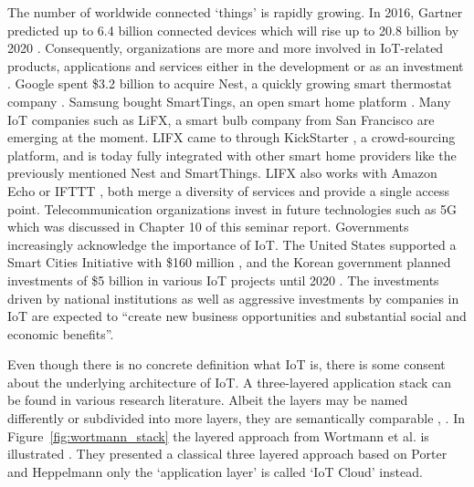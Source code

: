 	The number of worldwide connected `things' is rapidly growing. In 2016, Gartner predicted up to 6.4 billion connected devices which will rise up to 20.8 billion by 2020 \cite{gartner}. Consequently, organizations are more and more involved in IoT-related products, applications and services either in the development or as an investment \cite{ju}. Google spent \$3.2 billion to acquire Nest, a quickly growing smart thermostat company \cite{tilley_nest}. Samsung bought SmartTings, an open smart home platform \cite{tilley_smart}. Many IoT companies such as LiFX, a smart bulb company from San Francisco are emerging at the moment. LIFX came to through KickStarter , a crowd-sourcing platform, and is today fully integrated with other smart home providers like the previously mentioned Nest and SmartThings. LIFX also works with Amazon Echo  or IFTTT , both merge a diversity of services and provide a single access point. Telecommunication organizations invest in future technologies such as 5G which was discussed in Chapter 10 of this seminar report. Governments increasingly acknowledge the importance of IoT. The United States supported a Smart Cities Initiative with \$160 million \cite{miller}, and the Korean government planned investments of \$5 billion in various IoT projects until 2020 \cite{cho}. The investments driven by national institutions as well as aggressive investments by companies in IoT are expected to ``create new business opportunities and substantial social and economic benefits''\cite{ju}. 

	Even though there is no concrete definition what IoT is, there is some consent about the underlying architecture of IoT. A three-layered application stack can be found in various research literature. Albeit the layers may be named differently or subdivided into more layers, they are semantically comparable \cite{fleisch} \cite{ju}, \cite{wortmann}. In Figure~\ref{fig:wortmann_stack} the layered approach from Wortmann et al. is illustrated \cite{wortmann}. They presented a classical three layered approach based on Porter and Heppelmann  only the `application layer' is called `IoT Cloud' instead.

